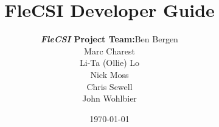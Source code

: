 
\title{\textbf{FleCSI Developer Guide}}
\date{\today}
\author{\begin{tabular}{rl}
        \textbf{\emph{FleCSI} Project Team:} & Ben Bergen \\
                                     & Marc Charest \\
                                     & Li-Ta (Ollie) Lo \\
                                     & Nick Moss \\
                                     & Chris Sewell \\
                                     & John Wohlbier
        \end{tabular}}

